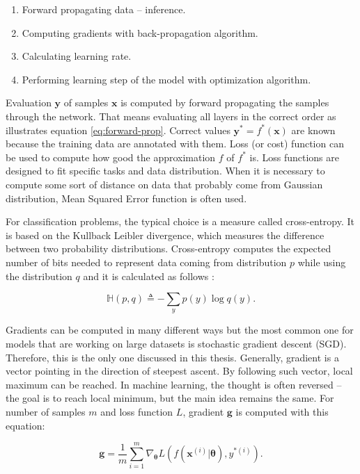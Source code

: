 \begin{enumerate}
    \item Forward propagating data -- inference.
    \item Computing gradients with back-propagation algorithm.
    \item Calculating learning rate.
    \item Performing learning step of the model with optimization algorithm.
\end{enumerate}

Evaluation $\pmb y$ of samples $\pmb x$ is computed by forward propagating the samples through the network. That means evaluating all layers in the correct order as illustrates equation \ref{eq:forward-prop}. Correct values $\pmb y^*=f^*(\pmb x)$ are known because the training data are annotated with them. Loss (or cost) function can be used to compute how good the approximation $f$ of $f^*$ is. Loss functions are designed to fit specific tasks and data distribution. When it is necessary to compute some sort of distance on data that probably come from Gaussian distribution, Mean Squared Error function is often used.

For classification problems, the typical choice is a measure called cross-entropy. It is based on the Kullback Leibler divergence, which measures the difference between two probability distributions. Cross-entropy computes the expected number of bits needed to represent data coming from distribution $p$ while using the distribution $q$ and it is calculated as follows \cite{pml1Book}:

\begin{equation}
    \label{eq:cross-entropy}
    \mathbb{H}(p, q) \triangleq -\sum\limits_{y} p(y) \log q(y).
\end{equation}

Gradients can be computed in many different ways but the most common one for models that are working on large datasets is stochastic gradient descent (SGD). Therefore, this is the only one discussed in this thesis. Generally, gradient is a vector pointing in the direction of steepest ascent. By following such vector, local maximum can be reached. In machine learning, the thought is often reversed -- the goal is to reach local minimum, but the main idea remains the same. For number of samples $m$ and loss function $L$, gradient $\pmb g$ is computed with this equation: 

\begin{equation}
    \label{eq:sgd}
    \pmb g = \frac{1}{m} \sum\limits_{i=1}^{m} \nabla_{\pmb \theta} L(f(\pmb {x}^{(i)}| \pmb \theta), {y}^{*(i)}).
\end{equation}

